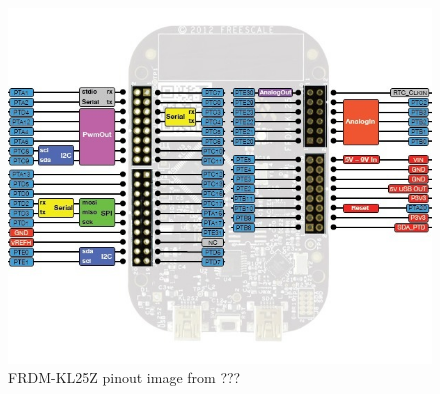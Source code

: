 \documentclass{beamer}
\begin{document}
\begin{frame}
\begin{columns}[t]
\begin{figure}
\centering
\includegraphics[width=1.0\columnwidth]{images-dis1/kl25z-pinout-revised}
\newline
FRDM-KL25Z pinout
{\tiny image from ???} %
\end{figure}
\end{columns}
\end{frame}
\end{document}

